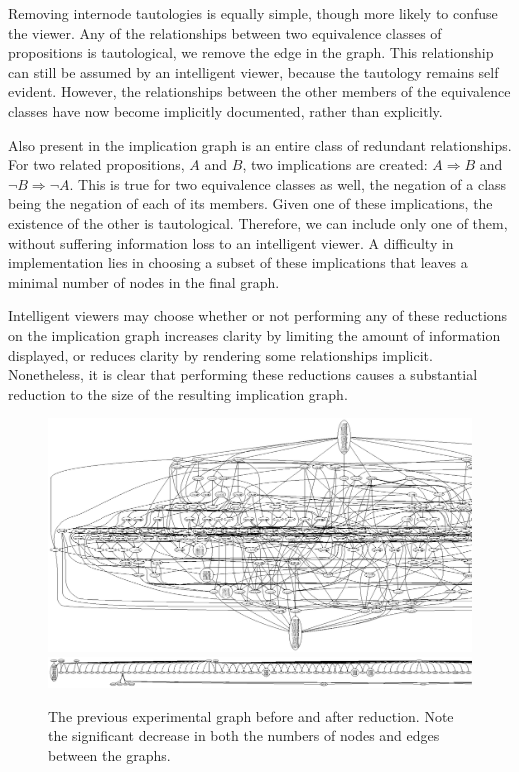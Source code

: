 \documentclass[11pt]{article}
\begin{document}
Removing internode tautologies is equally simple, though more likely to confuse the viewer. Any of the relationships between two equivalence classes of propositions is tautological, we remove the edge in the graph. This relationship can still be assumed by an intelligent viewer, because the tautology remains self evident. However, the relationships between the other members of the equivalence classes have now become implicitly documented, rather than explicitly.

Also present in the implication graph is an entire class of redundant relationships. For two related propositions, $A$ and $B$, two implications are created: $A \Rightarrow B$ and $\neg B \Rightarrow \neg A$. This is true for two equivalence classes as well, the negation of a class being the negation of each of its members. Given one of these implications, the existence of the other is tautological. Therefore, we can include only one of them, without suffering information loss to an intelligent viewer. A difficulty in implementation lies in choosing a subset of these implications that leaves a minimal number of nodes in the final graph.

Intelligent viewers may choose whether or not performing any of these reductions on the implication graph increases clarity by limiting the amount of information displayed, or reduces clarity by rendering some relationships implicit. Nonetheless, it is clear that performing these reductions causes a substantial reduction to the size of the resulting implication graph.

\begin{figure}
\includegraphics[scale=0.5]{div.ps}
\newline
\includegraphics[scale=0.5]{divreduced.ps}
\caption{The previous experimental graph before and after reduction. Note the significant decrease in both the numbers of nodes and edges between the graphs.}
\end{figure}
\end{document}
